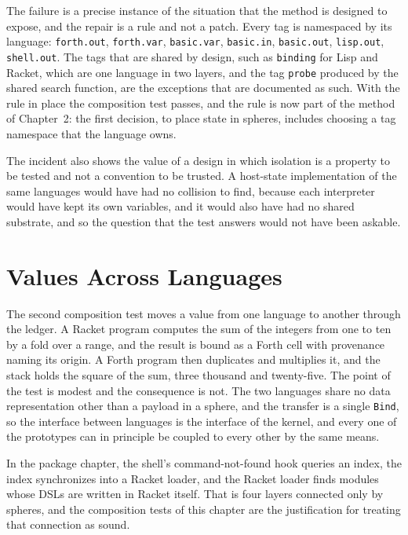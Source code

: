 The failure is a precise instance of the situation that the method is designed to expose, and the repair is a rule and not a patch. Every tag is namespaced by its language: \texttt{forth.out}, \texttt{forth.var}, \texttt{basic.var}, \texttt{basic.in}, \texttt{basic.out}, \texttt{lisp.out}, \texttt{shell.out}. The tags that are shared by design, such as \texttt{binding} for Lisp and Racket, which are one language in two layers, and the tag \texttt{probe} produced by the shared search function, are the exceptions that are documented as such. With the rule in place the composition test passes, and the rule is now part of the method of Chapter~2: the first decision, to place state in spheres, includes choosing a tag namespace that the language owns.

The incident also shows the value of a design in which isolation is a property to be tested and not a convention to be trusted. A host-state implementation of the same languages would have had no collision to find, because each interpreter would have kept its own variables, and it would also have had no shared substrate, and so the question that the test answers would not have been askable.

\section{Values Across Languages}

The second composition test moves a value from one language to another through the ledger. A Racket program computes the sum of the integers from one to ten by a fold over a range, and the result is bound as a Forth cell with provenance naming its origin. A Forth program then duplicates and multiplies it, and the stack holds the square of the sum, three thousand and twenty-five. The point of the test is modest and the consequence is not. The two languages share no data representation other than a payload in a sphere, and the transfer is a single \texttt{Bind}, so the interface between languages is the interface of the kernel, and every one of the prototypes can in principle be coupled to every other by the same means.

In the package chapter, the shell's command-not-found hook queries an index, the index synchronizes into a Racket loader, and the Racket loader finds modules whose DSLs are written in Racket itself. That is four layers connected only by spheres, and the composition tests of this chapter are the justification for treating that connection as sound.

